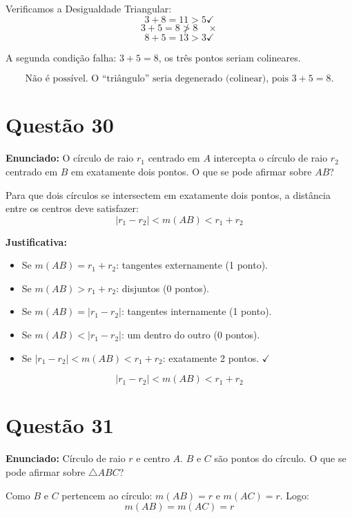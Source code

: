 \documentclass[12pt,a4paper]{article}
\begin{document}
Verificamos a Desigualdade Triangular:
$$3 + 8 = 11 > 5 \checkmark$$
$$3 + 5 = 8 \not> 8 \quad \times$$
$$8 + 5 = 13 > 3 \checkmark$$

A segunda condi\c{c}\~ao falha: $3 + 5 = 8$, os tr\^es pontos seriam colineares.

$$\boxed{\text{N\~ao \'e poss\'ivel. O ``tri\^angulo'' seria degenerado (colinear), pois } 3 + 5 = 8.}$$

\section*{Quest\~ao 30}

\textbf{Enunciado:} O c\'irculo de raio $r_1$ centrado em $A$ intercepta o c\'irculo de raio $r_2$ centrado em $B$ em exatamente dois pontos. O que se pode afirmar sobre $AB$?

Para que dois c\'irculos se intersectem em exatamente dois pontos, a dist\^ancia entre os centros deve satisfazer:
$$|r_1 - r_2| < m(AB) < r_1 + r_2$$

\textbf{Justificativa:}
\begin{itemize}
  \item Se $m(AB) = r_1 + r_2$: tangentes externamente (1 ponto).
  \item Se $m(AB) > r_1 + r_2$: disjuntos (0 pontos).
  \item Se $m(AB) = |r_1 - r_2|$: tangentes internamente (1 ponto).
  \item Se $m(AB) < |r_1 - r_2|$: um dentro do outro (0 pontos).
  \item Se $|r_1 - r_2| < m(AB) < r_1 + r_2$: exatamente 2 pontos. $\checkmark$
\end{itemize}

$$\boxed{|r_1 - r_2| < m(AB) < r_1 + r_2}$$

\section*{Quest\~ao 31}

\textbf{Enunciado:} C\'irculo de raio $r$ e centro $A$. $B$ e $C$ s\~ao pontos do c\'irculo. O que se pode afirmar sobre $\triangle ABC$?

Como $B$ e $C$ pertencem ao c\'irculo: $m(AB) = r$ e $m(AC) = r$. Logo:
$$m(AB) = m(AC) = r$$
\end{document}
